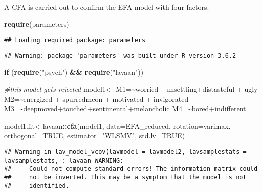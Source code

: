 \documentclass[
]{article}
\newenvironment{Shaded}{\begin{snugshade}}{\end{snugshade}}
\newcommand{\CommentTok}[1]{\textcolor[rgb]{0.56,0.35,0.01}{\textit{#1}}}
\newcommand{\ControlFlowTok}[1]{\textcolor[rgb]{0.13,0.29,0.53}{\textbf{#1}}}
\newcommand{\DataTypeTok}[1]{\textcolor[rgb]{0.13,0.29,0.53}{#1}}
\newcommand{\KeywordTok}[1]{\textcolor[rgb]{0.13,0.29,0.53}{\textbf{#1}}}
\newcommand{\NormalTok}[1]{#1}
\newcommand{\OperatorTok}[1]{\textcolor[rgb]{0.81,0.36,0.00}{\textbf{#1}}}
\newcommand{\OtherTok}[1]{\textcolor[rgb]{0.56,0.35,0.01}{#1}}
\newcommand{\StringTok}[1]{\textcolor[rgb]{0.31,0.60,0.02}{#1}}
\begin{document}
A CFA is carried out to confirm the EFA model with four factors.

\begin{Shaded}
\begin{Highlighting}[]
\KeywordTok{require}\NormalTok{(parameters)}
\end{Highlighting}
\end{Shaded}

\begin{verbatim}
## Loading required package: parameters
\end{verbatim}

\begin{verbatim}
## Warning: package 'parameters' was built under R version 3.6.2
\end{verbatim}

\begin{Shaded}
\begin{Highlighting}[]
\ControlFlowTok{if}\NormalTok{ (}\KeywordTok{require}\NormalTok{(}\StringTok{"psych"}\NormalTok{) }\OperatorTok{\&\&}\StringTok{ }\KeywordTok{require}\NormalTok{(}\StringTok{"lavaan"}\NormalTok{))}
  

  \CommentTok{\#this model gets rejected}
\NormalTok{  model1\textless{}{-}}\StringTok{\textquotesingle{}}
\StringTok{  M1=\textasciitilde{}worried+ unsettling+distasteful + ugly }
\StringTok{  M2=\textasciitilde{}energized + spurredmeon + motivated + invigorated}
\StringTok{  M3=\textasciitilde{}deepmoved+touched+sentimental+melancholic}
\StringTok{  M4=\textasciitilde{}bored+indifferent\textquotesingle{}}
   
\NormalTok{ model1.fit\textless{}{-}lavaan}\OperatorTok{::}\KeywordTok{cfa}\NormalTok{(model1,}
                         \DataTypeTok{data=}\NormalTok{EFA\_reduced,}
                         \DataTypeTok{rotation=}\StringTok{\textquotesingle{}varimax\textquotesingle{}}\NormalTok{,}
                         \DataTypeTok{orthogonal=}\OtherTok{TRUE}\NormalTok{, }
                         \DataTypeTok{estimator=}\StringTok{"WLSMV"}\NormalTok{, }
                         \DataTypeTok{std.lv=}\OtherTok{TRUE}\NormalTok{)}
\end{Highlighting}
\end{Shaded}

\begin{verbatim}
## Warning in lav_model_vcov(lavmodel = lavmodel2, lavsamplestats = lavsamplestats, : lavaan WARNING:
##     Could not compute standard errors! The information matrix could
##     not be inverted. This may be a symptom that the model is not
##     identified.
\end{verbatim}
\end{document}
